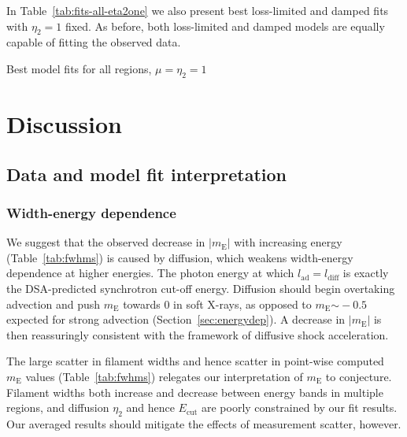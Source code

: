 \documentclass[iop, apj, numberedappendix]{emulateapj}
\newcommand*{\mt}{\mathrm}
\newcommand*{\abt}{\mathord{\sim}} %
\newcommand*{\mE}{m_\mt{E}}
\newcommand*{\Ecut}{E_{\mt{cut}}}
\begin{document}
In Table~\ref{tab:fits-all-eta2one} we also present best loss-limited and
damped fits with $\eta_2 = 1$ fixed.  As before, both loss-limited and damped
models are equally capable of fitting the observed data.

\begin{table}
    \scriptsize
    \centering
    \caption{Best model fits for all regions, $\mu = \eta_2 = 1$
    \label{tab:fits-all-eta2one}}
    
\end{table}


\section{Discussion}

\subsection{Data and model fit interpretation}

\subsubsection{Width-energy dependence}

We suggest that the observed decrease in $|\mE|$ with increasing energy
(Table~\ref{tab:fwhms}) is caused by diffusion, which weakens width-energy
dependence at higher energies.  The photon energy at which $l_{\mt{ad}} =
l_{\mt{diff}}$ is exactly the DSA-predicted synchrotron cut-off energy.
Diffusion should begin overtaking advection and push $\mE$ towards $0$ in soft
X-rays, as opposed to $\mE \abt -0.5$ expected for strong advection
(Section~\ref{sec:energydep}).  A decrease in $|\mE|$ is then reassuringly
consistent with the framework of diffusive shock acceleration.

The large scatter in filament widths and hence scatter in point-wise computed
$\mE$ values (Table~\ref{tab:fwhms}) relegates our interpretation of $\mE$ to
conjecture.  Filament widths both increase and decrease between energy bands in
multiple regions, and diffusion $\eta_2$ and hence $\Ecut$ are poorly
constrained by our fit results.  Our averaged results should mitigate the
effects of measurement scatter, however.
\end{document}
